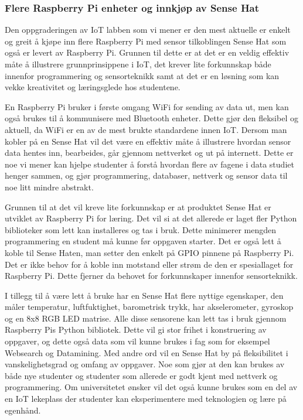 \documentclass{article}
\begin{document}
\subsubsection{Flere Raspberry Pi enheter og innkjøp av Sense Hat}

Den oppgraderingen av IoT labben som vi mener er den mest aktuelle er enkelt og greit å kjøpe inn flere Raspberry Pi med sensor tilkoblingen Sense Hat som også er levert av Raspberry Pi. Grunnen til dette er at det er en veldig effektiv måte å illustrere grunnprinsippene i IoT, det krever lite forkunnskap både innenfor programmering og sensorteknikk samt at det er en løsning som kan vekke kreativitet og læringsglede hos studentene.

En Raspberry Pi bruker i første omgang WiFi for sending av data ut, men kan også brukes til å kommunisere med Bluetooth enheter. Dette gjør den fleksibel og aktuell, da WiFi er en av de mest brukte standardene innen IoT. Dersom man kobler på en Sense Hat vil det være en effektiv måte å illustrere hvordan sensor data hentes inn, bearbeides, går gjennom nettverket og ut på internett. Dette er noe vi mener kan hjelpe studenter å forstå hvordan flere av fagene i data studiet henger sammen, og gjør programmering, databaser, nettverk og sensor data til noe litt mindre abstrakt.

Grunnen til at det vil kreve lite forkunnskap er at produktet Sense Hat er utviklet av Raspberry Pi for læring. Det vil si at det allerede er laget fler Python biblioteker som lett kan installeres og tas i bruk. Dette minimerer mengden programmering en student  må kunne før oppgaven starter. Det er også lett å koble til Sense Haten, man setter den enkelt på GPIO pinnene på Raspberry Pi. Det er ikke behov for å koble inn motstand eller strøm de den er spesiallaget for Raspberry Pi. Dette fjerner da behovet for forkunnskaper innenfor sensorteknikk. 

I tillegg til å være lett å bruke har en Sense Hat flere nyttige egenskaper, den måler temperatur, luftfuktighet, barometrisk trykk, har akselerometer, gyroskop og en 8x8 RGB LED matrise. Alle disse sensorene kan lett tas i bruk gjennom Raspberry Pis Python bibliotek. Dette vil gi stor frihet i konstruering av oppgaver, og dette også data som vil kunne brukes i fag som for eksempel Websearch og Datamining. Med andre ord vil en Sense Hat by på fleksibilitet i vanskelighetsgrad og omfang av oppgaver. Noe som gjør at den kan brukes av både nye studenter og studenter som allerede er godt kjent med nettverk og programmering. Om universitetet ønsker vil det også kunne brukes som en del av en IoT lekeplass der studenter kan eksperimentere med teknologien og lære på egenhånd. 
\end{document}
